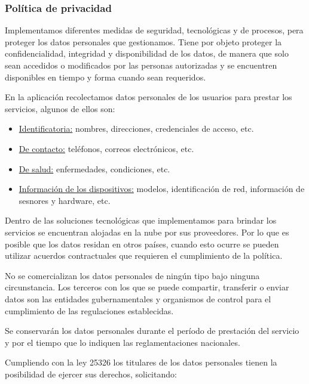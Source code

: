 \documentclass[a4paper,12pt]{article}
\begin{document}
    \subsubsection{Política de privacidad}
    \par Implementamos diferentes medidas de seguridad, tecnológicas y de procesos, pera proteger los datos personales que gestionamos. Tiene por objeto proteger la confidencialidad, integridad y disponibilidad de los datos, de manera que solo sean accedidos o modificados por las personas autorizadas y se encuentren disponibles en tiempo y forma cuando sean requeridos.
    \par En la aplicación recolectamos datos personales de los usuarios para prestar los servicios, algunos de ellos son:
    \begin{itemize}
        \item \underline{Identificatoria:} nombres, direcciones, credenciales de acceso, etc.
        \item \underline{De contacto:} teléfonos, correos electrónicos, etc.
        \item \underline{De salud:} enfermedades, condiciones, etc.
        \item \underline{Información de los dispositivos:} modelos, identificación de red, información de sesnores y hardware, etc.
    \end{itemize}
    \par Dentro de las soluciones tecnológicas que implementamos para brindar los servicios se encuentran alojadas en la nube por sus proveedores. Por lo que es posible que los datos residan en otros países, cuando esto ocurre se pueden utilizar acuerdos contractuales que requieren el cumplimiento de la política.
    \par No se comercializan los datos personales de ningún tipo bajo ninguna circunstancia. Los terceros con los que se puede compartir, transferir o enviar datos son las entidades gubernamentales y organismos de control para el cumplimiento de las regulaciones establecidas.
    \par Se conservarán los datos personales durante el período de prestación del servicio y por el tiempo que lo indiquen las reglamentaciones nacionales.
    \par Cumpliendo con la ley 25326 \cite{Ley25326} los titulares de los datos personales tienen la posibilidad de ejercer sus derechos, solicitando:
\end{document}
